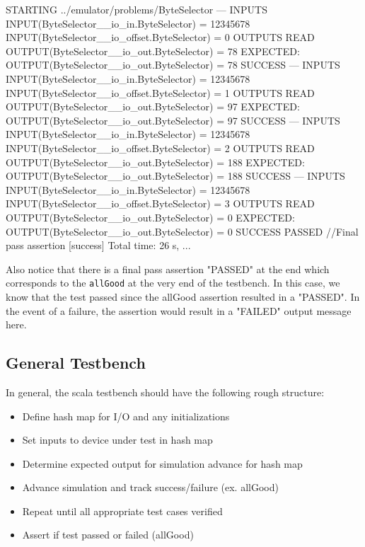 \documentclass[twocolumn, 10pt]{article}
\begin{document}
\begin{bash}
STARTING ../emulator/problems/ByteSelector
---
INPUTS
  INPUT(ByteSelector__io_in.ByteSelector) = 12345678
  INPUT(ByteSelector__io_offset.ByteSelector) = 0
OUTPUTS
  READ OUTPUT(ByteSelector__io_out.ByteSelector) = 78
  EXPECTED: OUTPUT(ByteSelector__io_out.ByteSelector) = 78
  SUCCESS
---
INPUTS
  INPUT(ByteSelector__io_in.ByteSelector) = 12345678
  INPUT(ByteSelector__io_offset.ByteSelector) = 1
OUTPUTS
  READ OUTPUT(ByteSelector__io_out.ByteSelector) = 97
  EXPECTED: OUTPUT(ByteSelector__io_out.ByteSelector) = 97
  SUCCESS
---
INPUTS
  INPUT(ByteSelector__io_in.ByteSelector) = 12345678
  INPUT(ByteSelector__io_offset.ByteSelector) = 2
OUTPUTS
  READ OUTPUT(ByteSelector__io_out.ByteSelector) = 188
  EXPECTED: OUTPUT(ByteSelector__io_out.ByteSelector) = 188
  SUCCESS
---
INPUTS
  INPUT(ByteSelector__io_in.ByteSelector) = 12345678
  INPUT(ByteSelector__io_offset.ByteSelector) = 3
OUTPUTS
  READ OUTPUT(ByteSelector__io_out.ByteSelector) = 0
  EXPECTED: OUTPUT(ByteSelector__io_out.ByteSelector) = 0
  SUCCESS
PASSED   //Final pass assertion
[success] Total time: 26 s, ...
\end{bash}

Also notice that there is a final pass assertion "PASSED" at the end which corresponds to the \verb+allGood+ at the very end of the testbench. In this case, we know that the test passed since the allGood assertion resulted in a "PASSED". In the event of a failure, the assertion would result in a "FAILED" output message here.

\subsection{General Testbench}

In general, the scala testbench should have the following rough structure:

\begin{itemize}
\item Define hash map for I/O and any initializations
\item Set inputs to device under test in hash map
\item Determine expected output for simulation advance for hash map
\item Advance simulation and track success/failure (ex. allGood)
\item Repeat until all appropriate test cases verified
\item Assert if test passed or failed (allGood)
\end{itemize}
\end{document}
